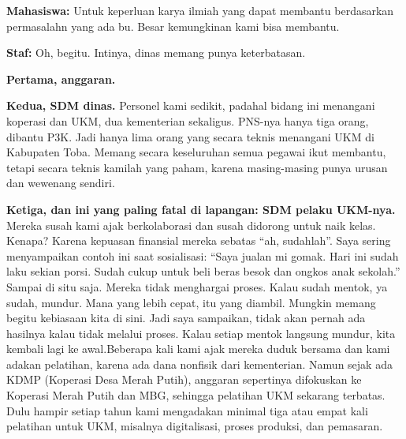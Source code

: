 {\noindent \textbf{Mahasiswa:} Untuk keperluan karya ilmiah yang dapat membantu berdasarkan permasalahn yang ada bu. Besar kemungkinan kami bisa membantu.

\noindent \textbf{Staf:} Oh, begitu. Intinya, dinas memang punya keterbatasan.

\noindent \textbf{Pertama, anggaran.}

\noindent \textbf{Kedua, SDM dinas.} Personel kami sedikit, padahal bidang ini menangani koperasi dan UKM, dua kementerian sekaligus. PNS-nya hanya tiga orang, dibantu P3K. Jadi hanya lima orang yang secara teknis menangani UKM di Kabupaten Toba. Memang secara keseluruhan semua pegawai ikut membantu, tetapi secara teknis kamilah yang paham, karena masing-masing punya urusan dan wewenang sendiri.

\noindent \textbf{Ketiga, dan ini yang paling fatal di lapangan: SDM pelaku UKM-nya.} Mereka susah kami ajak berkolaborasi dan susah didorong untuk naik kelas. Kenapa? Karena kepuasan finansial mereka sebatas ``ah, sudahlah''. Saya sering menyampaikan contoh ini saat sosialisasi: ``Saya jualan mi gomak. Hari ini sudah laku sekian porsi. Sudah cukup untuk beli beras besok dan ongkos anak sekolah.'' Sampai di situ saja. Mereka tidak menghargai proses. Kalau sudah mentok, ya sudah, mundur. Mana yang lebih cepat, itu yang diambil. Mungkin memang begitu kebiasaan kita di sini. Jadi saya sampaikan, tidak akan pernah ada hasilnya kalau tidak melalui proses. Kalau setiap mentok langsung mundur, kita kembali lagi ke awal.Beberapa kali kami ajak mereka duduk bersama dan kami adakan pelatihan, karena ada dana nonfisik dari kementerian. Namun sejak ada KDMP (Koperasi Desa Merah Putih), anggaran sepertinya difokuskan ke Koperasi Merah Putih dan MBG, sehingga pelatihan UKM sekarang terbatas. Dulu hampir setiap tahun kami mengadakan minimal tiga atau empat kali pelatihan untuk UKM, misalnya digitalisasi, proses produksi, dan pemasaran.

}

